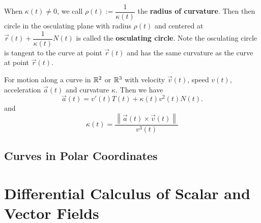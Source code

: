 \documentclass[a4paper]{ctexart}
\begin{document}
    \begin{mydef}
        When $\kappa(t) \ne 0$, we call $\rho(t) := \dfrac{1}{\kappa(t)}$ the \textbf{radius of curvature}. Then then circle in the osculating plane with radius $\rho(t)$ and centered at $\vec r(t) + \dfrac{1}{\kappa(t)} N(t)$ is called the \textbf{osculating circle}. Note the osculating circle is tangent to the curve at point $\vec r(t)$ and has the same curvature as the curve at point $\vec r(t)$.
    \end{mydef}

    \begin{mythm}
        For motion along a curve in $\mathbb{R}^2$ or $\mathbb{R}^3$ with velocity $\vec v(t)$, speed $v(t)$, acceleration $\vec a(t)$ and curvature $\kappa$. Then we have
        $$ \vec a(t) = v'(t) T(t) + \kappa (t) v^2(t) N(t). $$
        and
        $$ \kappa (t) = \frac{\left\|\vec a (t) \times \vec v (t)\right\|}{v^3 (t)}
        $$
    \end{mythm}
    \subsection{Curves in Polar Coordinates}
    
    \newpage
    \section{Differential Calculus of Scalar and Vector Fields}
\end{document}

